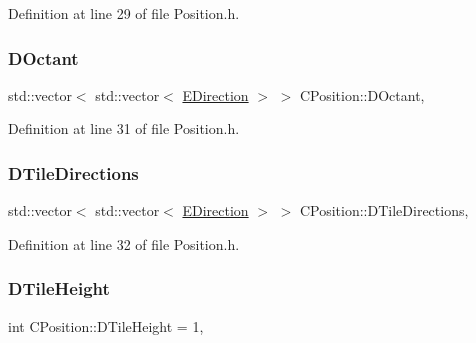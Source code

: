 Definition at line 29 of file Position.\+h.

\hypertarget{classCPosition_a0f7a420e82a180b983e32258729bb984}{}\label{classCPosition_a0f7a420e82a180b983e32258729bb984} 
\subsubsection{\texorpdfstring{D\+Octant}{DOctant}}
{\footnotesize\ttfamily std\+::vector$<$ std\+::vector$<$ \hyperlink{GameDataTypes_8h_acb2b033915f6659a71a38b5aa6e4eb42}{E\+Direction} $>$ $>$ C\+Position\+::\+D\+Octant\hspace{0.3cm}{\ttfamily [static]}, {\ttfamily [protected]}}



Definition at line 31 of file Position.\+h.

\hypertarget{classCPosition_ab4bc566d2d14d378cfdf6b1d2d3f522e}{}\label{classCPosition_ab4bc566d2d14d378cfdf6b1d2d3f522e} 
\subsubsection{\texorpdfstring{D\+Tile\+Directions}{DTileDirections}}
{\footnotesize\ttfamily std\+::vector$<$ std\+::vector$<$ \hyperlink{GameDataTypes_8h_acb2b033915f6659a71a38b5aa6e4eb42}{E\+Direction} $>$ $>$ C\+Position\+::\+D\+Tile\+Directions\hspace{0.3cm}{\ttfamily [static]}, {\ttfamily [protected]}}



Definition at line 32 of file Position.\+h.

\hypertarget{classCPosition_a202ebb83e86df75cfb76cf1241ba817c}{}\label{classCPosition_a202ebb83e86df75cfb76cf1241ba817c} 
\subsubsection{\texorpdfstring{D\+Tile\+Height}{DTileHeight}}
{\footnotesize\ttfamily int C\+Position\+::\+D\+Tile\+Height = 1\hspace{0.3cm}{\ttfamily [static]}, {\ttfamily [protected]}}



